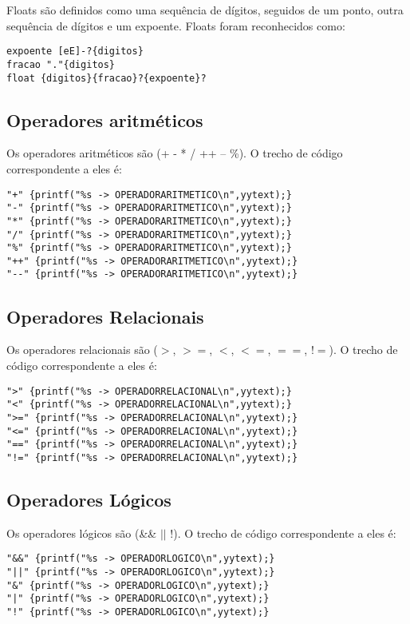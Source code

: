 \documentclass[a4paper,10pt]{article}
\begin{document}
Floats são definidos como uma sequência de dígitos, seguidos de um ponto, outra sequência de dígitos e um expoente. Floats foram
reconhecidos como:
\begin{verbatim}
expoente [eE]-?{digitos} 
fracao "."{digitos}
float {digitos}{fracao}?{expoente}?
\end{verbatim}  


  \subsection{Operadores aritméticos}
  Os operadores aritméticos são (+  -  *  /  ++  -- \%). O trecho de código correspondente a eles é:
  \begin{verbatim}
"+" {printf("%s -> OPERADORARITMETICO\n",yytext);}
"-" {printf("%s -> OPERADORARITMETICO\n",yytext);}
"*" {printf("%s -> OPERADORARITMETICO\n",yytext);}
"/" {printf("%s -> OPERADORARITMETICO\n",yytext);}
"%" {printf("%s -> OPERADORARITMETICO\n",yytext);}
"++" {printf("%s -> OPERADORARITMETICO\n",yytext);}
"--" {printf("%s -> OPERADORARITMETICO\n",yytext);}
  \end{verbatim}


  \subsection{Operadores Relacionais}
  Os operadores relacionais são ($>$, $>=$, $<$, $<=$, $==$, $!=$). O trecho de código correspondente a eles é:
  \begin{verbatim}
">" {printf("%s -> OPERADORRELACIONAL\n",yytext);}
"<" {printf("%s -> OPERADORRELACIONAL\n",yytext);}
">=" {printf("%s -> OPERADORRELACIONAL\n",yytext);}
"<=" {printf("%s -> OPERADORRELACIONAL\n",yytext);}
"==" {printf("%s -> OPERADORRELACIONAL\n",yytext);}
"!=" {printf("%s -> OPERADORRELACIONAL\n",yytext);}
  \end{verbatim}

  \subsection{Operadores Lógicos}
  Os operadores lógicos são (\&\& $||$ !). O trecho de código correspondente a eles é:
  \begin{verbatim}
"&&" {printf("%s -> OPERADORLOGICO\n",yytext);}
"||" {printf("%s -> OPERADORLOGICO\n",yytext);}
"&" {printf("%s -> OPERADORLOGICO\n",yytext);}
"|" {printf("%s -> OPERADORLOGICO\n",yytext);}
"!" {printf("%s -> OPERADORLOGICO\n",yytext);}
  \end{verbatim}
\end{document}
